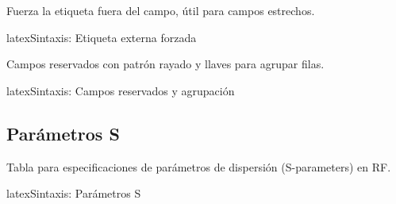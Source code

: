 \begin{protocolframe}[8]
\end{protocolframe}

\vspace{1em}

Fuerza la etiqueta fuera del campo, útil para campos estrechos.

\begin{codigosimple}{latex}{Sintaxis: Etiqueta externa forzada}
\end{codigosimple}

\begin{protocolframe}[16]
\end{protocolframe}

\vspace{1em}

Campos reservados con patrón rayado y llaves para agrupar filas.

\begin{codigosimple}{latex}{Sintaxis: Campos reservados y agrupación}
\end{codigosimple}

\begin{protocolframe}[16]
\end{protocolframe}

\subsection{Parámetros S}
\label{subsec:sparams}

Tabla para especificaciones de parámetros de dispersión (S-parameters) en RF.

\begin{codigosimple}{latex}{Sintaxis: Parámetros S}
\begin{rfspecs}[Título]
\end{rfspecs}
\end{codigosimple}

